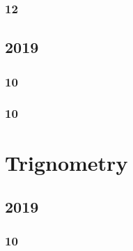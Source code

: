 \documentclass[11pt]{book}
\begin{document}
\subsection{12}



\section{2019}
\subsection{10}

\subsection{10}


\chapter{Trignometry}
\section{2019}
\subsection{10}



%
% 
\backmatter
\appendix
\iffalse
\chapter{Conic Lines}
\section{Pair of Straight Lines}
%

\section{Intersection of Conics}

\section{ Chords of a Conic}

\section{ Tangent and Normal}

\fi
%

%
%
%
\latexprintindex
\end{document}
